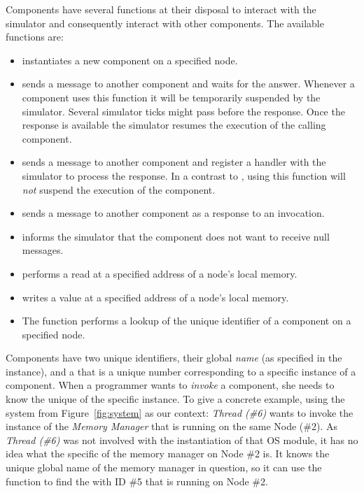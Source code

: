 Components have several functions at their disposal to interact with the simulator and consequently interact with other components.
The available functions are:
\begin{itemize}
\item {}
instantiates a new component on a specified node.
\item {}
sends a message to another component and waits for the answer.
Whenever a component uses this function it will be temporarily suspended by the simulator.
Several simulator ticks might pass before the response.
Once the response is available the simulator resumes the execution of the calling component.
\item {}
sends a message to another component and register a handler with the simulator to process the response.
In a contrast to , using this function will \emph{not} suspend the execution of the component.
\item {}
sends a message to another component as a response to an invocation.
\item {}
informs the simulator that the component does not want to receive null messages.
\item {}
performs a read at a specified address of a node's local memory.
\item {}
writes a value at a specified address of a node's local memory.
\item The function {}
performs a lookup of the unique identifier of a component on a specified node.
\end{itemize}
Components have two unique identifiers, their global \emph{name} (as specified in the  instance), and a  that is a unique number corresponding to a specific instance of a component.
When a programmer wants to \emph{invoke} a component, she needs to know the unique \mbox{} of the specific instance.
To give a concrete example, using the system from Figure~\ref{fig:system} as our context: \emph{Thread (\#6)} wants to invoke the instance of the \emph{Memory Manager} that is running on the same Node (\#2).
As \emph{Thread (\#6)} was not involved with the instantiation of that OS module, it has no idea what the specific  of the memory manager on Node \#2 is.
It knows the unique global name of the memory manager in question, so it can use the  function to find the  with ID \#5 that is running on Node \#2.

